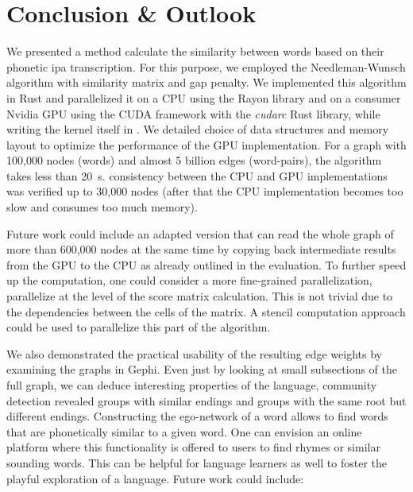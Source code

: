 \section{Conclusion \& Outlook}
\label{sec:conclusion}

We presented a method calculate the similarity between words based on their phonetic \gls{ipa} transcription. For this purpose, we employed the Needleman-Wunsch algorithm with similarity matrix and gap penalty. We implemented this algorithm in Rust and parallelized it on a CPU using the Rayon library and on a consumer Nvidia GPU using the CUDA framework with the \textit{cudarc} Rust library, while writing the kernel itself in \Cpp. We detailed choice of data structures and memory layout to optimize the performance of the GPU implementation. For a graph with 100,000 nodes (words) and almost 5 billion edges (word-pairs), the algorithm takes less than \qty{20}{\s}. consistency between the CPU and GPU implementations was verified up to 30,000 nodes (after that the CPU implementation becomes too slow and consumes too much memory).

Future work could include an adapted version that can read the whole graph of more than 600,000 nodes at the same time by copying back intermediate results from the GPU to the CPU as already outlined in the evaluation. To further speed up the computation, one could consider a more fine-grained parallelization, \ie parallelize at the level of the score matrix calculation. This is not trivial due to the dependencies between the cells of the matrix. A stencil computation approach could be used to parallelize this part of the algorithm.

We also demonstrated the practical usability of the resulting edge weights by examining the graphs in Gephi. Even just by looking at small subsections of the full graph, we can deduce interesting properties of the language, \eg community detection revealed groups with similar endings and groups with the same root but different endings. Constructing the ego-network of a word allows to find words that are phonetically similar to a given word. One can envision an online platform where this functionality is offered to users to find rhymes or similar sounding words. This can be helpful for language learners as well to foster the playful exploration of a language. Future work could include:

